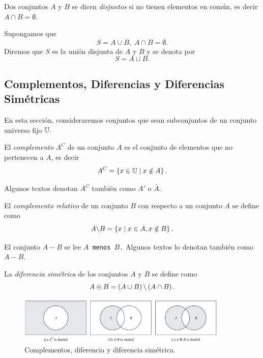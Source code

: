 	Dos conjuntos $A$ y $B$ se dicen \emph{disjuntos} si no tienen elementos en com\'un, es decir $A\cap B=\emptyset$.
	
	
	Supongamos que 
	$$
	S=A\cup B, \; A\cap B=\emptyset.
	$$  Diremos que $S$ es la uni\'on disjunta de $A$ y $B$ y se denota por $$S=A \sqcup B.$$ 
	


\subsection{Complementos, Diferencias y Diferencias Sim\'etricas}


	En esta secci\'on, consideraremos conjuntos que sean subconjuntos de un conjunto universo fijo $\mathbb{U}.$



	El \emph{complemento} $A^{C}$ de un conjunto $A$ es el conjunto de elementos que no pertenecen a $A$, es decir 
	$$A^{C}=\left\{ x\in \mathbb{U} \mid x \notin A \right\}.$$



	Algunos textos denotan $A^{C}$ tambi\'en como $A'$ o $\bar{A}.$ 



	El \emph{complemento relativo} de un conjunto $B$ con respecto a un conjunto $A$ se define como 
	$$
	A\backslash B = \left\{ x \mid x \in A, x \notin B \right\}.
	$$


% 
% 
% 



	El conjunto $A\minus B$ se lee \texttt{$A$ menos $B$.} Algunos textos lo denotan tambi\'en como $A-B.$  



	La \emph{diferencia sim\'etrica} de los conjuntos $A$ y $B$ se define como $$A\oplus B=\left( A\cup B \right)\backslash \left( A \cap B \right).$$



	\begin{figure}
		\centering
		\includegraphics[width=10cm,keepaspectratio=true]{./md/venn_complemento.png}
		\caption{Complementos, diferencia y diferencia simétrica.}
		\label{fig:0104}
	\end{figure}
	




